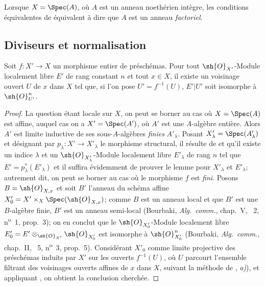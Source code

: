 \begin{remark}[21.7.7]
\label{IV.21.7.7}
Lorsque $X=\Spec(A)$, où $A$ est un anneau noethérien intègre, les conditions équivalentes de  équivalent à dire que $A$ est un anneau \emph{factoriel}.
\end{remark}

\subsection{Diviseurs et normalisation}
\label{subsection:IV.21.8}

\begin{lemma}[21.8.1]
\label{IV.21.8.1}
Soit $f:X'\to X$ un morphisme entier de préschémas.
Pour tout $\sh{O}_{X'}$-Module localement libre $E'$ de rang constant $n$ et tout $x\in X$, il existe un voisinage ouvert $U$ de $x$ dans $X$ tel que, si l'on pose $U'=f^{-1}(U)$, $E'|U'$ soit isomorphe à $\sh{O}_{U'}^n$.
\end{lemma}

\begin{proof}
La question étant locale sur $X$, on peut se borner au cas où $X=\Spec(A)$ est affine, auquel cas on a $X'=\Spec(A')$, où $A'$ est une $A$-algèbre entière.
Alors $A'$ est limite inductive de ses sous-$A$-algèbres \emph{finies} $A'_\lambda$.
Posant $X'_\lambda=\Spec(A'_\lambda)$ et désignant par $p_\lambda:X'\to X'_\lambda$ le morphisme structural, il résulte de  et  qu'il existe un indice $\lambda$ et un $\sh{O}_{X'_\lambda}$-Module localement libre $E'_\lambda$ de rang $n$ tel que $E'=p_\lambda^*(E'_\lambda)$ et il suffira évidemment de prouver le lemme pour $X'_\lambda$ et $E'_\lambda$;
autrement dit, on peut se borner au cas où le morphisme $f$ est \emph{fini}.
Posons $B=\sh{O}_{X,x}$ et soit $B'$ l'anneau du schéma affine $X'_0=X'\times_X\Spec(\sh{O}_{X,x})$;
comme $B$ est un anneau local et que $B'$ est une $B$-algèbre finie, $B'$ est un anneau semi-local (Bourbaki, \emph{Alg.\ comm.}, chap.~V, \textsection~2, n\textsuperscript{o}~1, prop.~3);
on en conclut que le $\sh{O}_{X'_0}$-Module localement libre $E'_0=E'\otimes_{\sh{O}_{X'}}\sh{O}_{X'_0}$ est isomorphe à $\sh{O}_{X'_0}^n$ (Bourbaki, \emph{Alg.\ comm.}, chap.~II, \textsection~5, n\textsuperscript{o}~3, prop.~5).
Considérant $X'_0$ comme limite
projective des préschémas induits par $X'$ sur les ouverts $f^{-1}(U)$, où $U$ parcourt l'ensemble filtrant des voisinages ouverts affines de $x$ dans $X$, suivant la méthode de , \emph{a)}), et appliquant , on obtient la conclusion cherchée.
\end{proof}

